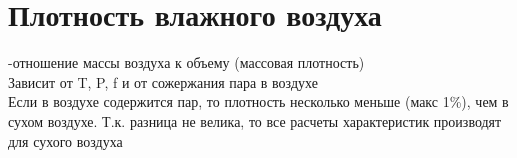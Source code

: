 
\section{Плотность влажного воздуха}
-отношение массы воздуха к объему (массовая плотность)\\
Зависит от T, P, f и от сожержания пара в воздухе\\
Если в воздухе содержится пар, то плотность несколько меньше (макс 1\%), чем в сухом воздухе. Т.к. разница не велика, то все расчеты характеристик производят для сухого воздуха